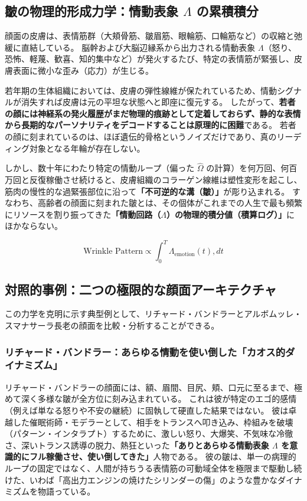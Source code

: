 \subsection{皺の物理的形成力学：情動表象 $\Lambda$ の累積積分}
顔面の皮膚は、表情筋群（大頬骨筋、皺眉筋、眼輪筋、口輪筋など）の収縮と弛緩に直結している。
脳幹および大脳辺縁系から出力される情動表象 $\Lambda$（怒り、恐怖、軽蔑、歓喜、知的集中など）が発火するたび、特定の表情筋が緊張し、皮膚表面に微小な歪み（応力）が生じる。

若年期の生体組織においては、皮膚の弾性線維が保たれているため、情動シグナルが消失すれば皮膚は元の平坦な状態へと即座に復元する。
したがって、\textbf{若者の顔には神経系の発火履歴がまだ物理的痕跡として定着しておらず、静的な表情から長期的なパーソナリティをデコードすることは原理的に困難}である。
若者の顔に刻まれているのは、ほぼ遺伝的骨格というノイズだけであり、真のリーディング対象となる年輪が存在しない。

しかし、数十年にわたり特定の情動ループ（偏った $\hat{\Omega}$ の計算）を何万回、何百万回と反復稼働させ続けると、皮膚組織のコラーゲン線維は塑性変形を起こし、筋肉の慢性的な過緊張部位に沿って\textbf{「不可逆的な溝（皺）」}が彫り込まれる。
すなわち、高齢者の顔面に刻まれた皺とは、その個体がこれまでの人生で最も頻繁にリソースを割り振ってきた\textbf{「情動回路（$\Lambda$）の物理的積分値（積算ログ）」}にほかならない。

\begin{equation}
\text{Wrinkle Pattern} \propto \int_{0}^{T} \Lambda_{\mathrm{emotion}}(t) , dt
\end{equation}

\subsection{対照的事例：二つの極限的な顔面アーキテクチャ}
この力学を克明に示す典型例として、リチャード・バンドラーとアルボムッレ・スマナサーラ長老の顔面を比較・分析することができる。

\subsubsection{リチャード・バンドラー：あらゆる情動を使い倒した「カオス的ダイナミズム」}
リチャード・バンドラーの顔面には、額、眉間、目尻、頬、口元に至るまで、極めて深く多様な皺が全方位に刻み込まれている。
これは彼が特定のエゴ的感情（例えば単なる怒りや不安の継続）に固執して硬直した結果ではない。
彼は卓越した催眠術師・モデラーとして、相手をトランスへ叩き込み、枠組みを破壊（パターン・インタラプト）するために、激しい怒り、大爆笑、不気味な冷徹さ、深いトランス誘導の脱力、熱狂といった\textbf{「ありとあらゆる情動表象 $\Lambda$ を意識的にフル稼働させ、使い倒してきた」}人物である。
彼の皺は、単一の病理的ループの固定ではなく、人間が持ちうる表情筋の可動域全体を極限まで駆動し続けた、いわば「高出力エンジンの焼けたシリンダーの傷」のような豊かなダイナミズムを物語っている。

